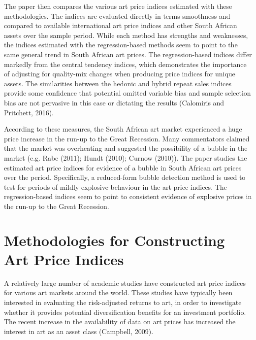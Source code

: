 \documentclass[12pt,]{article}
\begin{document}
The paper then compares the various art price indices estimated with
these methodologies. The indices are evaluated directly in terms
smoothness and compared to available international art price indices and
other South African assets over the sample period. While each method has
strengths and weaknesses, the indices estimated with the
regression-based methods seem to point to the same general trend in
South African art prices. The regression-based indices differ markedly
from the central tendency indices, which demonstrates the importance of
adjusting for quality-mix changes when producing price indices for
unique assets. The similarities between the hedonic and hybrid repeat
sales indices provide some confidence that potential omitted variable
bias and sample selection bias are not pervasive in this case or
dictating the results (Calomiris and Pritchett, 2016).

According to these measures, the South African art market experienced a
huge price increase in the run-up to the Great Recession. Many
commentators claimed that the market was overheating and suggested the
possibility of a bubble in the market (e.g. Rabe (2011); Hundt (2010);
Curnow (2010)). The paper studies the estimated art price indices for
evidence of a bubble in South African art prices over the period.
Specifically, a reduced-form bubble detection method is used to test for
periods of mildly explosive behaviour in the art price indices. The
regression-based indices seem to point to consistent evidence of
explosive prices in the run-up to the Great Recession.

\section{Methodologies for Constructing Art Price
Indices}\label{methodologies-for-constructing-art-price-indices}

A relatively large number of academic studies have constructed art price
indices for various art markets around the world. These studies have
typically been interested in evaluating the risk-adjusted returns to
art, in order to investigate whether it provides potential
diversification benefits for an investment portfolio. The recent
increase in the availability of data on art prices has increased the
interest in art as an asset class (Campbell, 2009).
\end{document}
